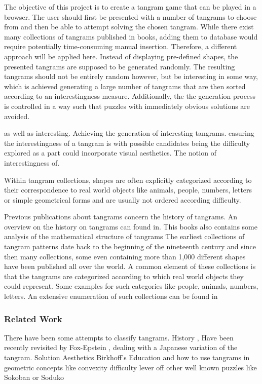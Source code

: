 The objective of this project is to create a tangram game that can be played in a browser. The user should first be presented with a number of tangrams to choose from and then be able to attempt solving the chosen tangram. 
While there exist many collections of tangrams published in books, adding them to database would require potentially time-consuming manual insertion. Therefore, a different approach will be applied here. Instead of displaying pre-defined shapes, the presented tangrams are supposed to be generated randomly. The resulting tangrams should not be entirely random however, but be interesting in some way, which is achieved generating a large number of tangrams that are then sorted according to an interestingness measure. Additionally, the the generation process is controlled in a way such that puzzles with immediately obvious solutions are avoided. 


as well as interesting. Achieving the generation of interesting tangrams. 
easuring the interestingness of a tangram is with possible candidates being the difficulty 
 explored as a part could incorporate visual aesthetics.
The notion of interestingness of. 

Within tangram collections, shapes are often explicitly categorized according to their correspondence to real world objects like animals, people, numbers, letters or simple geometrical forms and are usually not ordered according difficulty. 


Previous publications about tangrams concern the history of tangrams. An overview on the history on tangrams can found in. This books also contains some analysis of the mathematical structure of tangrams 
The earliest collections of tangram patterns date back to the beginning of the nineteenth century \cite{elffers76} and since then many collections, some even containing more than 1,000 different shapes have been published all over the world. A common element of these collections is that the tangrams are categorized according to which real world objects they could represent. Some examples for such categories 
like people, animals, numbers, letters. An extensive enumeration of such collections can be found in \cite{slocum03}

\subsubsection*{Related Work}

There have been some attempts to classify tangrams. 
History , \cite{wang42} 
Have been recently revisited by Fox-Epstein \cite{foxepstein14}, dealing with a Japanese variation of the tangram.
Solution \cite{deutsch72} \cite{oflazer93} \cite{kovalsky14}
Aesthetics \cite{eberle14}
Birkhoff's \cite{filonik09}
Education and how to use tangrams in geometric concepts like \cite{koeller99} convexity
difficulty lever off other well known puzzles like Sokoban \cite{jaruvsek10} or Soduko \cite{hunt07}
\cite{cai08}

